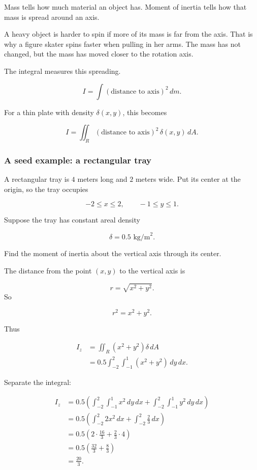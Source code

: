Mass tells how much material an object has.  Moment of inertia tells how that mass is
spread around an axis.

A heavy object is harder to spin if more of its mass is far from the axis.  That is why a
figure skater spins faster when pulling in her arms.  The mass has not changed, but the
mass has moved closer to the rotation axis.

The integral measures this spreading.

\[
\boxed{
    I=\int (\text{distance to axis})^2\,dm.
}
\]

For a thin plate with density \(\delta(x,y)\), this becomes

\[
\boxed{
    I=\iint_R (\text{distance to axis})^2\,\delta(x,y)\,dA.
}
\]

\subsubsection*{A seed example: a rectangular tray}

A rectangular tray is \(4\) meters long and \(2\) meters wide.  Put its center at the
origin, so the tray occupies

\[
    -2\le x\le2,
    \qquad
    -1\le y\le1.
\]

Suppose the tray has constant areal density

\[
    \delta=0.5\text{ kg/m}^2.
\]

Find the moment of inertia about the vertical axis through its center.

The distance from the point \((x,y)\) to the vertical axis is

\[
    r=\sqrt{x^2+y^2}.
\]
So

\[
    r^2=x^2+y^2.
\]

Thus

\[
\begin{aligned}
I_z
&=
\iint_R (x^2+y^2)\delta\,dA\\
&=
0.5\int_{-2}^{2}\int_{-1}^{1}(x^2+y^2)\,dy\,dx.
\end{aligned}
\]

Separate the integral:

\[
\begin{aligned}
I_z
&=
0.5\left(
\int_{-2}^{2}\int_{-1}^{1}x^2\,dy\,dx
+
\int_{-2}^{2}\int_{-1}^{1}y^2\,dy\,dx
\right)\\
&=
0.5\left(
\int_{-2}^{2}2x^2\,dx
+
\int_{-2}^{2}\frac{2}{3}\,dx
\right)\\
&=
0.5\left(
2\cdot\frac{16}{3}
+
\frac{2}{3}\cdot4
\right)\\
&=
0.5\left(
\frac{32}{3}+\frac{8}{3}
\right)\\
&=
\frac{20}{3}.
\end{aligned}
\]

